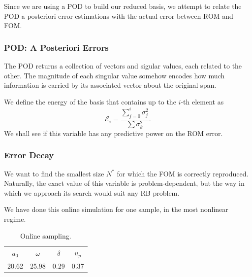 \documentclass[../../thesis.tex]{subfiles}
\begin{document}
Since we are using a POD to build our reduced basis, 
we attempt to relate the POD a posteriori error estimations with 
the actual error between ROM and FOM.

\subsubsection{POD: A Posteriori Errors}
The POD returns a collection of vectors and sigular values, each related to the other.
The magnitude of each singular value somehow encodes 
how much information is carried by its associated vector about the original span.

We define the energy of the basis that contains up to the $i$-th element as
\begin{equation}
    \mathcal{E}_i = \frac{\sum_{j=0}^{i}\sigma_j^2}{\sum \sigma_k^2}.
\end{equation}
We shall see if this variable has any predictive power on the ROM error.


\subsubsection{Error Decay}
We want to find the smallest size $N^{*}$ for which the FOM is correctly reproduced.
Naturally, the exact value of this variable is problem-dependent, 
but the way in which we approach its search would suit any RB problem.

We have done this online simulation for one sample, in the most nonlinear regime.
\begin{table}[h]
    \centering
    \caption{Online sampling.}
    \begin{tabular}{cccc}
    \toprule
        $a_0$ & $\omega$ & $\delta$ & $u_p$
        \\ \midrule
        20.62 & 25.98    & 0.29     & 0.37
        \\ \bottomrule
    \end{tabular}
\end{table}
\end{document}
